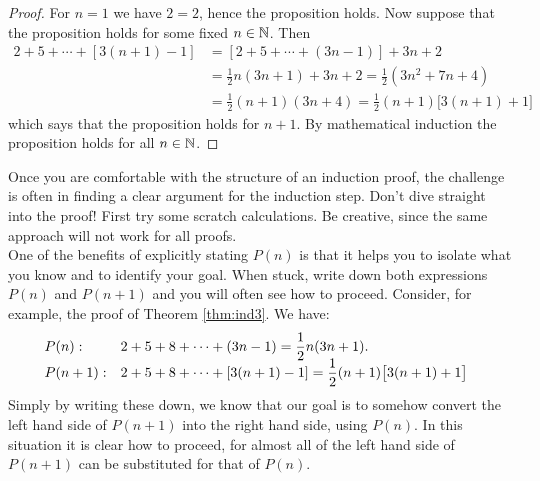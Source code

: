 \begin{proof}
	For $n=1$ we have $2=2$, hence the proposition holds. Now suppose that the proposition holds for some fixed $n\in\mathbb{N}$. Then
	\begin{align*}
		2+5+\cdots+[3(n+1)-1]&=\left[2+5+\cdots+(3n-1)\right]+3n+2\\
		&=\frac 12n(3n+1)+3n+2=\frac 12(3n^2+7n+4)\\
		&=\frac 12(n+1)(3n+4)=\frac 12(n+1)\bigl[3(n+1)+1\bigr]
	\end{align*}
	which says that the proposition holds for $n+1$. By mathematical induction the proposition holds for all $n\in\mathbb{N}$.
\end{proof}


Once you are comfortable with the structure of an induction proof, the challenge is often in finding a clear argument for the induction step. Don't dive straight into the proof! First try some scratch calculations. Be creative, since the same approach will not work for all proofs.\\
One of the benefits of explicitly stating $P(n)$ is that it helps you to isolate what you know and to identify your goal. When stuck, write down both expressions $P(n)$ and $P(n+1)$ and you will often see how to proceed. Consider, for example, the proof of Theorem \ref{thm:ind3}. We have:
\begin{gather*}
	\begin{array}{@{}l@{}l}
		P(n):&\displaystyle 2+5+8+\cdots+(3n-1)=\frac 12n(3n+1).\\[-1pt]
		P(n+1):\quad &\displaystyle 2+5+8+\cdots+[3(n+1)-1]=\frac 12(n+1)\bigl[3(n+1)+1\bigr]
	\end{array}
\end{gather*}
Simply by writing these down, we know that our goal is to somehow convert the left hand side of $P(n+1)$ into the right hand side, using $P(n)$. In this situation it is clear how to proceed, for almost all of the left hand side of $P(n+1)$ can be substituted for that of $P(n)$.\par

